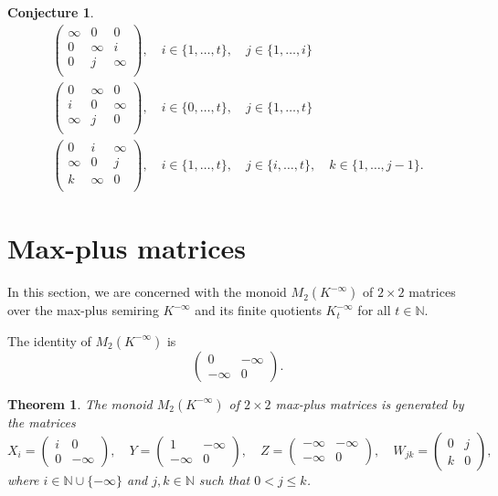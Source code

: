 \documentclass{amsart}
\newcommand{\mat}[4]{\begin{pmatrix}#1&#2\\#3&#4\end{pmatrix}}
\newcommand{\COMMA}{,\quad}
\newcommand{\N}{\mathbb{N}}
\numberwithin{equation}{section}
\newtheorem{thm}[equation]{Theorem}
\newtheorem{conj}[equation]{Conjecture}
\theoremstyle{definition}
\begin{document}
\begin{conj}
\begin{equation*}
\begin{array}{l}
      \begin{pmatrix}
        \infty & 0      & 0      \\
        0      & \infty & i      \\
        0      & j      & \infty \\
      \end{pmatrix}, 
      \quad
      i \in \{1, \ldots, t\},
      \quad 
      j \in \{1, \ldots, i\}
      \\
      \begin{pmatrix}
        0      & \infty & 0      \\
        i      & 0      & \infty \\
        \infty & j      & 0      \\
      \end{pmatrix}, 
      \quad
      i \in \{0, \ldots, t\},
      \quad 
      j \in \{1, \ldots, t\}
      \\
      \begin{pmatrix}
        0      & i      & \infty \\
        \infty & 0      & j      \\
        k      & \infty & 0      \\
      \end{pmatrix}, 
      \quad
      i \in \{1, \ldots, t\},
      \quad 
      j \in \{i, \ldots, t\},
      \quad 
      k \in \{1, \ldots, j - 1\}.
    \end{array}
  \end{equation*}
\end{conj}


\section{Max-plus matrices}

In this section, we are concerned with the monoid $M_2(K^{-\infty})$ of $2\times
2$ matrices over the max-plus semiring $K^{-\infty}$ and its finite quotients
$K^{-\infty}_t$ for all $t\in \N$. 

The identity of $M_2(K^{-\infty})$ is 
\begin{equation*}
  \mat0{-\infty}{-\infty}0.
\end{equation*}

\begin{thm}
  The monoid $M_2(K^{-\infty})$ of $2 \times 2$ max-plus matrices is
  generated by the matrices 
  \[
  X_i = \mat i00{-\infty} \COMMA
  Y = \mat 1{-\infty}{-\infty}0 \COMMA
  Z = \mat {-\infty}{-\infty}{-\infty}0 \COMMA
  W_{jk} = \mat 0jk0 ,
  \]
  where $i\in\N\cup \{-\infty\}$ and $j, k\in\N$ such that $0< j \leq k$.
\end{thm}
\end{document}
